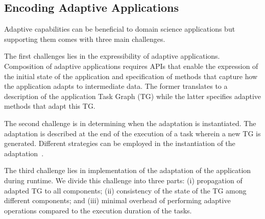 \documentclass[conference]{IEEEtran}
\begin{document}




\subsection{Encoding Adaptive Applications}\label{ssec:challenges}

Adaptive capabilities can be beneficial to domain science applications but
supporting them comes with three main challenges.

The first challenges lies in the expressibility of adaptive applications.
Composition of adaptive applications requires APIs that enable the expression
of the initial state of the application and specification of methods that
capture how the application adapts to intermediate data. The former translates
to a description of the application Task Graph (TG) while the latter specifies
adaptive methods that adapt this TG\@.

The second challenge is in determining when the adaptation is instantiated.
The adaptation is described at the end of the execution of a task wherein a
new TG is generated. Different strategies can be employed in the
instantiation of the adaptation~\cite{van2000dealing}.

The third challenge lies in implementation of the adaptation of the
application during runtime. We divide this challenge into three parts: (i)
propagation of adapted TG to all components; (ii) consistency of the state of
the TG among different components; and (iii) minimal overhead of performing
adaptive operations compared to the execution duration of the tasks.
\end{document}
